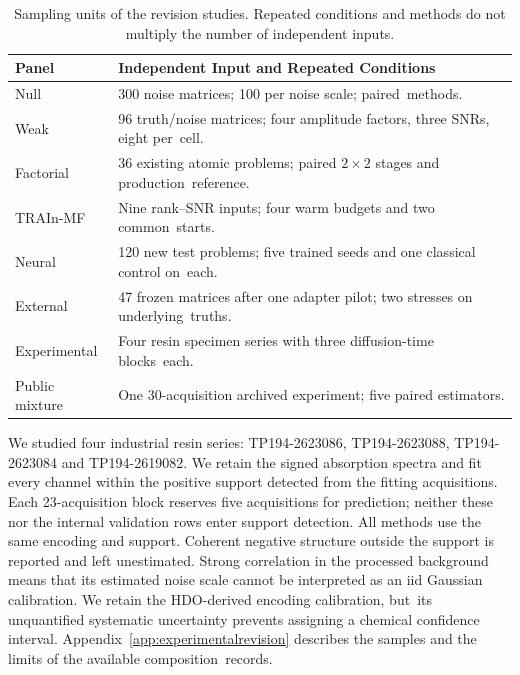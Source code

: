 \documentclass[mathematics,article,accept,moreauthors]{Definitions/mdpi}
\begin{document}
\begin{table}[H]\small
\caption{Sampling units of the revision studies. Repeated conditions and
methods do not multiply the number of independent inputs.}\label{tab:revisionunits}
\begin{tabularx}{\textwidth}{m{2.5cm}L}\toprule
\textbf{Panel} & \textbf{Independent Input and Repeated Conditions}\\\midrule
Null & 300 noise matrices; 100 per noise scale; paired~methods.\\
Weak & 96 truth/noise matrices; four amplitude factors, three SNRs, eight per~cell.\\
Factorial & 36 existing atomic problems; paired $2\times2$ stages and production~reference.\\
TRAIn-MF & Nine rank--SNR inputs; four warm budgets and two common~starts.\\
Neural & 120 new test problems; five trained seeds and one classical control on~each.\\
External & 47 frozen matrices after one adapter pilot; two stresses on~ underlying~truths.\\
Experimental & Four resin specimen series with three diffusion-time blocks~each.\\
Public mixture & One 30-acquisition archived experiment; five paired estimators.\\\bottomrule
\end{tabularx}\end{table}

We studied four industrial resin series: TP194-2623086, TP194-2623088,
TP194-2623084 and TP194-2619082. We retain the signed absorption spectra and fit
every channel within the positive support detected from the fitting acquisitions.
Each 23-acquisition block reserves five acquisitions for prediction; neither
these nor the internal validation rows enter support detection. All methods use
the same encoding and support. Coherent negative structure outside the support is
reported and left unestimated. Strong correlation in the processed background
means that its estimated noise scale cannot be interpreted as an iid Gaussian
calibration. We retain the HDO-derived encoding calibration, but~its unquantified
systematic uncertainty prevents assigning a chemical confidence interval.
Appendix~\ref{app:experimentalrevision} describes the samples and the limits of
the available composition~records.


%
\end{document}
